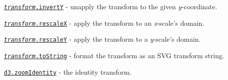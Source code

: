 \begin{DoxyItemize}
\item \href{https://github.com/d3/d3-zoom/blob/master/README.md#transform_invertY}{\tt {\itshape transform}.invertY} -\/ unapply the transform to the given {\itshape y}-\/coordinate.
\item \href{https://github.com/d3/d3-zoom/blob/master/README.md#transform_rescaleX}{\tt {\itshape transform}.rescaleX} -\/ apply the transform to an {\itshape x}-\/scale’s domain.
\item \href{https://github.com/d3/d3-zoom/blob/master/README.md#transform_rescaleY}{\tt {\itshape transform}.rescaleY} -\/ apply the transform to a {\itshape y}-\/scale’s domain.
\item \href{https://github.com/d3/d3-zoom/blob/master/README.md#transform_toString}{\tt {\itshape transform}.to\+String} -\/ format the transform as an S\+VG transform string.
\item \href{https://github.com/d3/d3-zoom/blob/master/README.md#zoomIdentity}{\tt d3.\+zoom\+Identity} -\/ the identity transform. 
\end{DoxyItemize}